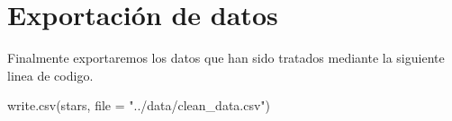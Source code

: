 \documentclass[
]{article}
\newenvironment{Shaded}{\begin{snugshade}}{\end{snugshade}}
\newcommand{\AttributeTok}[1]{\textcolor[rgb]{0.80,0.80,0.80}{#1}}
\newcommand{\FunctionTok}[1]{\textcolor[rgb]{0.94,0.94,0.56}{#1}}
\newcommand{\NormalTok}[1]{\textcolor[rgb]{0.80,0.80,0.80}{#1}}
\newcommand{\StringTok}[1]{\textcolor[rgb]{0.80,0.58,0.58}{#1}}
\begin{document}
\hypertarget{exportaciuxf3n-de-datos}{%
\section{Exportación de datos}\label{exportaciuxf3n-de-datos}}

Finalmente exportaremos los datos que han sido tratados mediante la
siguiente linea de codigo.

\begin{Shaded}
\begin{Highlighting}[]
\FunctionTok{write.csv}\NormalTok{(stars, }\AttributeTok{file =} \StringTok{"../data/clean\_data.csv"}\NormalTok{)}
\end{Highlighting}
\end{Shaded}
\end{document}
